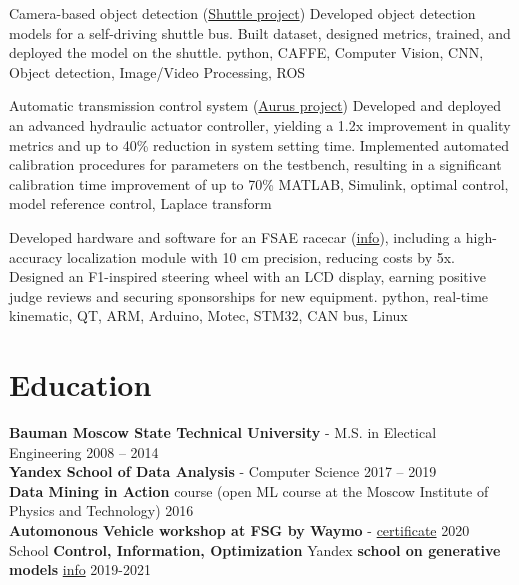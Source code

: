 \documentclass[]{resume}
\begin{document}
\project
{Camera-based object detection  (\href{https://www.engadget.com/2016/08/28/yandex-teams-on-self-driving-shuttle-bus/}{Shuttle project})}
{}
{Developed object detection models for a self-driving shuttle bus. Built dataset, designed metrics, trained, and deployed the model on the shuttle.}
{python, CAFFE, Computer Vision, CNN, Object detection, Image/Video Processing, ROS}

\project
{Automatic transmission control system (\href{https://en.wikipedia.org/wiki/Aurus_Senat}{Aurus project})}
{}
{Developed and deployed an advanced hydraulic actuator controller, yielding a 1.2x improvement in quality metrics and up to 40\% reduction in system setting time. Implemented automated calibration procedures for parameters on the testbench, resulting in a significant calibration time improvement of up to 70\%}
{MATLAB, Simulink, optimal control, model reference control, Laplace transform}

\project
{}
{}
{Developed hardware and software for an FSAE racecar (\href{https://baumanracing.ru/en/}{info}), including a high-accuracy localization module with 10 cm precision, reducing costs by 5x. Designed an F1-inspired steering wheel with an LCD display, earning positive judge reviews and securing sponsorships for new equipment.}
{python, real-time kinematic, QT, ARM, Arduino, Motec, STM32, CAN bus, Linux}

\section*{\sectionformat Education}
\textbf{Bauman Moscow State Technical University} - M.S. in Electical Engineering \hfill 2008 -- 2014 \\
\textbf{Yandex School of Data Analysis} - Computer Science \hfill 2017 -- 2019 \\
\textbf{Data Mining in Action} course (open ML course at the Moscow Institute of Physics and Technology) \hfill    2016         \\
\textbf{Automonous Vehicle workshop at FSG by Waymo} - \href{https://drive.google.com/file/d/1-WxECccxBrRWIvEt9WQeXKTueiF658r7/view?usp=sharing}{certificate}   \hfill  2020       \\
School \textbf{Control, Information, Optimization}
Yandex \textbf{school on generative models} \href{https://indico.cern.ch/event/1082512/timetable/#20211123}{info}                  \hfill  2019-2021
\end{document}
